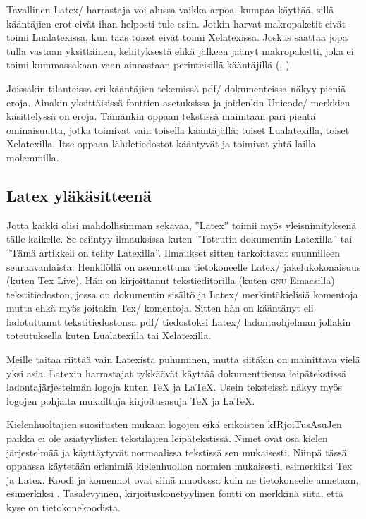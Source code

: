 Tavallinen Latex\-/ harrastaja voi alussa vaikka arpoa, kumpaa käyttää,
sillä kääntäjien erot eivät ihan helposti tule esiin. Jotkin harvat
makropaketit eivät toimi Lualatexissa, kun taas toiset eivät toimi
Xelatexissa. Joskus saattaa jopa tulla vastaan yksittäinen, kehityksestä
ehkä jälkeen jäänyt makropaketti, joka ei toimi kummassakaan vaan
ainoastaan perinteisillä kääntäjillä (, ).

Joissakin tilanteissa eri kääntäjien tekemissä pdf\-/ dokumenteissa
näkyy pieniä eroja. Ainakin yksittäisissä fonttien asetuksissa ja
joidenkin Unicode\-/ merkkien käsittelyssä on eroja. Tämänkin oppaan
tekstissä mainitaan pari pientä ominaisuutta, jotka toimivat vain
toisella kääntäjällä: toiset Lualatexilla, toiset Xelatexilla. Itse
oppaan lähdetiedostot kääntyvät ja toimivat yhtä lailla molemmilla.

\subsection{Latex yläkäsitteenä}

Jotta kaikki olisi mahdollisimman sekavaa, ''Latex'' toimii myös
yleisnimityksenä tälle kaikelle. Se esiintyy ilmauksissa kuten
''Toteutin dokumentin Latexilla'' tai ''Tämä artikkeli on tehty
Latexilla''. Ilmaukset sitten tarkoittavat suunnilleen seuraavanlaista:
Henkilöllä on asennettuna tietokoneelle Latex\-/ jakelukokonaisuus
(kuten Tex Live). Hän on kirjoittanut tekstieditorilla (kuten
\textsc{gnu} Emacsilla) tekstitiedoston, jossa on dokumentin sisältö ja
Latex\-/ merkintäkielisiä komentoja mutta ehkä myös joitakin Tex\-/
komentoja. Sitten hän on kääntänyt eli ladotuttanut tekstitiedostonsa
pdf\-/ tiedostoksi Latex\-/ ladontaohjelman jollakin toteutuksella kuten
Lualatexilla tai Xelatexilla.

Meille taitaa riittää vain Latexista puhuminen, mutta siitäkin on
mainittava vielä yksi asia. Latexin harrastajat tykkäävät käyttää
dokumenttiensa leipätekstissä ladontajärjestelmän logoja kuten \TeX{} ja
\LaTeX{}. Usein teksteissä näkyy myös logojen pohjalta mukailtuja
kirjoitusasuja TeX ja LaTeX.

Kielenhuoltajien suositusten mukaan logojen eikä erikoisten
kIRjoiTusAsuJen paikka ei ole asiatyylisten tekstilajien leipätekstissä.
Nimet ovat osa kielen järjestelmää ja käyttäytyvät normaalissa tekstissä
sen mukaisesti. Niinpä tässä oppaassa käytetään erisnimiä kielenhuollon
normien mukaisesti, esimerkiksi Tex ja Latex. Koodi ja komennot ovat
siinä muodossa kuin ne tietokoneelle annetaan, esimerkiksi
. Tasalevyinen, kirjoituskonetyylinen fontti on merkkinä
siitä, että kyse on tietokonekoodista.

